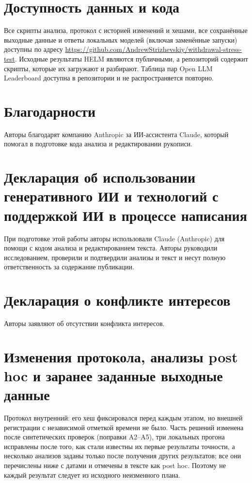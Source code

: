 \documentclass[preprint,12pt,authoryear]{elsarticle}
\begin{document}
\section*{Доступность данных и кода}
Все скрипты анализа, протокол с историей изменений и хешами, все сохранённые выходные данные и ответы локальных моделей (включая заменённые запуски) доступны по адресу \url{https://github.com/AndrewStrizhevskiy/withdrawal-stress-test}. Исходные результаты HELM являются публичными, а репозиторий содержит скрипты, которые их загружают и разбирают. Таблица пар Open LLM Leaderboard доступна в репозитории \citet{kim2025correlated} и не распространяется повторно.

\section*{Благодарности}
Авторы благодарят компанию Anthropic за ИИ-ассистента Claude, который помогал в подготовке кода анализа и редактировании рукописи.

\section*{Декларация об использовании генеративного ИИ и технологий с поддержкой ИИ в процессе написания}
При подготовке этой работы авторы использовали Claude (Anthropic) для помощи с кодом анализа и редактированием текста. Авторы руководили исследованием, проверили и подтвердили анализы и текст и несут полную ответственность за содержание публикации.

\section*{Декларация о конфликте интересов}
Авторы заявляют об отсутствии конфликта интересов.

\appendix
\section{Изменения протокола, анализы post hoc и заранее заданные выходные данные}
\label{app:amend}
\footnotesize
Протокол внутренний: его хеш фиксировался перед каждым этапом, но внешней регистрации с независимой отметкой времени не было. Часть решений изменена после синтетических проверок (поправки A2--A5), три локальных прогона исправлены после того, как стали известны их первые результаты точности, а несколько анализов заданы только после получения других результатов; все они перечислены ниже с датами и отмечены в тексте как post hoc. Поэтому не каждый результат следует из исходного неизменного плана.
\end{document}
